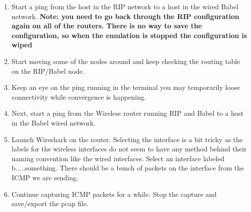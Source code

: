 \documentclass[main.tex]{subfiles}
\begin{document}
\begin{enumerate}[noitemsep,label=$\bullet$,leftmargin=20mm,labelsep=0.5cm]

\item Start a ping from the host in the RIP network to a host in the wired Babel network. \textbf{Note: you need to go back through the RIP configuration again on all of the routers.  There is no way to save the configuration, so when the emulation is stopped the configuration is wiped}

\item Start moving some of the nodes around and keep checking the routing table on the RIP/Babel node.

\item Keep an eye on the ping running in the terminal you may temporarily loose connectivity while convergence is happening.


\item Next, start a ping from the Wireless router running RIP and Babel to a host in the Babel wired network.

\item Launch Wireshark on the router.  Selecting the interface is a bit tricky as the labels for the wireless interfaces do not seem to have any method behind their naming convention like the wired interfaces. Select an interface labeled b.....something.  There should be a bunch of packets on the interface from the ICMP we are sending.

\item Continue capturing ICMP packets for a while.  Stop the capture and save/export the pcap file.




\end{enumerate}
\end{document}
